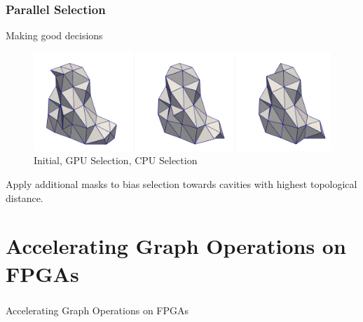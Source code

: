 \documentclass{beamer}
\begin{document}
\begin{frame}
  \frametitle{Parallel Selection}
  Making good decisions
  \begin{figure}
    \centering
    \includegraphics[width=\textwidth]{figures/selectionEx.png}\\
    Initial, GPU Selection, CPU Selection
  \end{figure}
  Apply additional masks to bias selection towards cavities with highest
  topological distance.
\end{frame}

\section{Accelerating Graph Operations on FPGAs}

\begin{frame}
  \frametitle{}
  \center \huge{Accelerating Graph Operations on FPGAs}
\end{frame}
\end{document}
